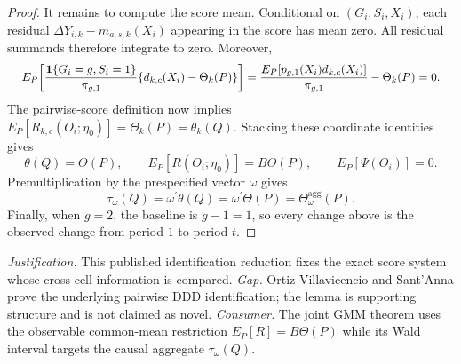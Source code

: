 \documentclass{article}
\begin{document}
\begin{proof}
It remains to compute the score mean. Conditional on \((G_i,S_i,X_i)\), each residual \(\Delta Y_{i,k}-m_{a,s,k}(X_i)\) appearing in the score has mean zero. All residual summands therefore integrate to zero. Moreover,
\[
\makebox[\linewidth][c]{\resizebox{0.98\linewidth}{!}{\(\displaystyle E_P\!\left[\frac{\mathbf 1\{G_i=g,S_i=1\}}{\pi_{g,1}}
 \{d_{k,c}(X_i)-\Theta_k(P)\}\right]
 =\frac{E_P[p_{g,1}(X_i)d_{k,c}(X_i)]}{\pi_{g,1}}-\Theta_k(P)=0.\)}}
\]
The pairwise-score definition now implies \(E_P[R_{k,c}(O_i;\eta_0)]=\Theta_k(P)=\theta_k(Q)\). Stacking these coordinate identities gives
\[
 \theta(Q)=\Theta(P),\qquad
 E_P[R(O_i;\eta_0)]=B\Theta(P),\qquad
 E_P[\Psi(O_i)]=0.
\]
Premultiplication by the prespecified vector \(\omega\) gives
\[
 \tau_\omega(Q)=\omega^{\prime}\theta(Q)
 =\omega^{\prime}\Theta(P)=\Theta_\omega^{\mathrm{agg}}(P).
\]
Finally, when \(g=2\), the baseline is \(g-1=1\), so every change above is the observed change from period \(1\) to period \(t\).
\end{proof}
\par\smallskip\noindent \textit{Justification.} This published identification reduction fixes the exact score system whose cross-cell information is compared. \textit{Gap.} Ortiz-Villavicencio and Sant'Anna prove the underlying pairwise DDD identification; the lemma is supporting structure and is not claimed as novel. \textit{Consumer.} The joint GMM theorem uses the observable common-mean restriction \(E_P[R]=B\Theta(P)\) while its Wald interval targets the causal aggregate \(\tau_\omega(Q)\).
\end{document}
